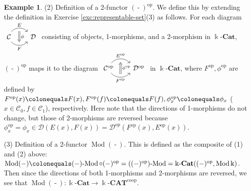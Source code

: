 \documentclass{surv-l}
\numberwithin{equation}{chapter}
\numberwithin{figure}{chapter}
\theoremstyle{plain}
\theoremstyle{definition}
\newtheorem{exm}[thm]{Example}
\theoremstyle{remark}
\newcommand{\kCAT}{\Bbbk\text{-}\mathbf{CAT}}
\newcommand{\kCat}{\Bbbk\text{-}\mathbf{Cat}}
\newcommand{\lMod}{\text{-}\!\Mod}
\newcommand{\Ar}[3]{\ar[from={#1}, to={#2}, #3]}
\DeclareMathOperator{\Mod}{Mod}
\DeclareMathOperator{\blank}{-}
\begin{document}
\begin{exm}
(2) Definition of a 2-functor $(\blank)^{\mathrm{op}}$.
We define this by extending the definition in Exercise  \ref{exc:representable-set}(3)
as follows.
For each diagram$
\begin{tikzcd}[row sep=4em, column sep=2em]
{\mathcal{C}} \ar[r, bend left=50, "E", "" '{name=D}, end anchor=north west]
\ar[r, bend right=50, "F" ', ""{name=U}, end anchor=south west]
& {\mathcal{D}}
\Ar{D}{U}{Rightarrow, "\phi"}
\end{tikzcd}
$
consisting of objects, 1-morphisms, and a 2-morphism in $\kCat$,
$(\blank)^{\mathrm{op}}$ maps it to the diagram
$
\begin{tikzcd}[row sep=4em, column sep=2em]
{\mathcal{C}}^{\mathrm{op}} \ar[r, bend left=50, "E^{\mathrm{op}}", "" '{name=D}, end anchor=north west]
\ar[r, bend right=50, "F^{\mathrm{op}}" ', ""{name=U}, end anchor=south west]
& {\mathcal{D}}^{\mathrm{op}}
\Ar{U}{D}{Rightarrow, "\phi^{\mathrm{op}}" '}
\end{tikzcd}
$
in $\kCat$,
where $F^{\mathrm{op}}, \phi^{\mathrm{op}}$ are defined by
$F^{\mathrm{op}}(x)\colonequals  F(x), F^{\mathrm{op}}(f)\colonequals  F(f), \phi^{\mathrm{op}}_x\colonequals \phi_x$
($x \in {\mathcal{C}}_0, f \in {\mathcal{C}}_1$), respectively.
Here note that the directions of
1-morphisms do not change, but those of 2-morphisms are reversed because
$\phi^{\mathrm{op}}_x=\phi_x \in {\mathcal{D}}(E(x), F(x)) = {\mathcal{D}}^{\mathrm{op}}(F^{\mathrm{op}}(x), E^{\mathrm{op}}(x))$.

(3) Definition of a 2-functor $\Mod(\blank)$.
This is defined as the composite of (1) and (2) above:
$\Mod(\blank)\colonequals  (\blank)\lMod \circ (\blank)^{\mathrm{op}} = ((\blank)^{\mathrm{op}})\lMod
= \kCat((\blank)^{\mathrm{op}}, \Mod\Bbbk)$.
Then since the directions of both 1-morphisms and 2-morphisms are reversed,
we see that
$\Mod(\blank) \colon \kCat \to \kCAT^{\mathrm{coop}}$.
\end{exm}
\end{document}
